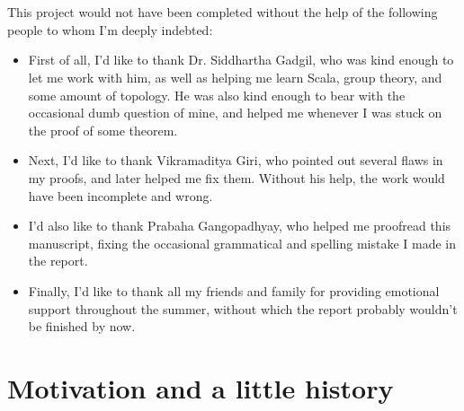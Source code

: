 \documentclass[12pt, titlepage]{article}
\theoremstyle{definition}
\begin{document}
\section*{\centering{\fontsize{50}{60} \selectfont{Acknowledgements}}}
This project would not have been completed without the help of the following people to whom I'm deeply indebted:
\begin{itemize}
\item First of all, I'd like to thank Dr. Siddhartha Gadgil, who was kind enough to let me work with him, as well as helping me learn Scala, group theory, and some amount of topology. He was also kind enough to bear with the occasional dumb question of mine, and helped me whenever I was stuck on the proof of some theorem.
\item Next, I'd like to thank Vikramaditya Giri, who pointed out several flaws in my proofs, and later helped me fix them. Without his help, the work would have been incomplete and wrong.
\item I'd also like to thank Prabaha Gangopadhyay, who helped me proofread this manuscript, fixing the occasional grammatical and spelling mistake I made in the report.
\item  Finally, I'd like to thank all my friends and family for providing emotional support throughout the summer, without which the report probably wouldn't be finished by now.
\end{itemize}


\thispagestyle{empty}

\clearpage

\tableofcontents

\newpage

\section{Motivation and a little history}\label{intro}
\end{document}
